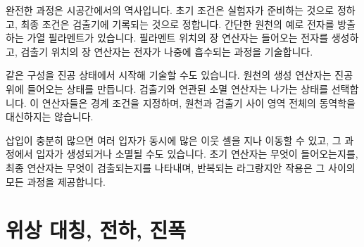 완전한 과정은 시공간에서의 역사입니다. 초기 조건은 실험자가 준비하는 것으로 정하고, 최종 조건은 검출기에 기록되는 것으로 정합니다. 간단한 원천의 예로 전자를 방출하는 가열 필라멘트가 있습니다. 필라멘트 위치의 장 연산자는 들어오는 전자를 생성하고, 검출기 위치의 장 연산자는 전자가 나중에 흡수되는 과정을 기술합니다.

\begin{classroomqa}
\end{classroomqa}

같은 구성을 진공 상태에서 시작해 기술할 수도 있습니다. 원천의 생성 연산자는 진공 위에 들어오는 상태를 만듭니다. 검출기와 연관된 소멸 연산자는 나가는 상태를 선택합니다. 이 연산자들은 경계 조건을 지정하며, 원천과 검출기 사이 영역 전체의 동역학을 대신하지는 않습니다.

\begin{classroomqa}
\end{classroomqa}

삽입이 충분히 많으면 여러 입자가 동시에 많은 이웃 셀을 지나 이동할 수 있고, 그 과정에서 입자가 생성되거나 소멸될 수도 있습니다. 초기 연산자는 무엇이 들어오는지를, 최종 연산자는 무엇이 검출되는지를 나타내며, 반복되는 라그랑지안 작용은 그 사이의 모든 과정을 제공합니다.

\begin{classroomqa}
\end{classroomqa}

\section{위상 대칭, 전하, 진폭}

